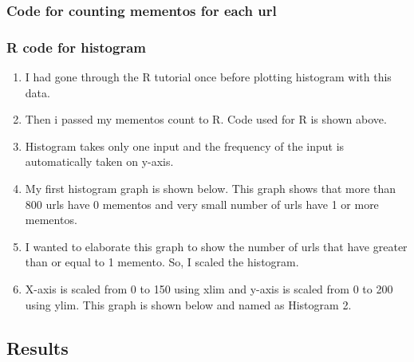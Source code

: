 \subsubsection{Code for counting mementos for each url}

\newpage
\subsubsection{R code for histogram}

\begin{enumerate}
\item I had gone through the R tutorial once before plotting histogram with this data.
\item Then i passed my mementos count to R. Code used for R is shown above.
\item Histogram takes only one input and the frequency of the input is automatically taken on y-axis. 
\item My first histogram graph is shown below. This graph shows that more than 800 urls have 0 mementos and very small number of urls have 1 or more mementos.
\item I wanted to elaborate this graph to show the number of urls that have greater than or equal to 1 memento. So, I scaled the histogram.
\item X-axis is scaled from 0 to 150 using xlim and y-axis is scaled from 0 to 200 using ylim. This graph is shown below and named as Histogram 2.
\end{enumerate}

\newpage
\subsection{Results}

